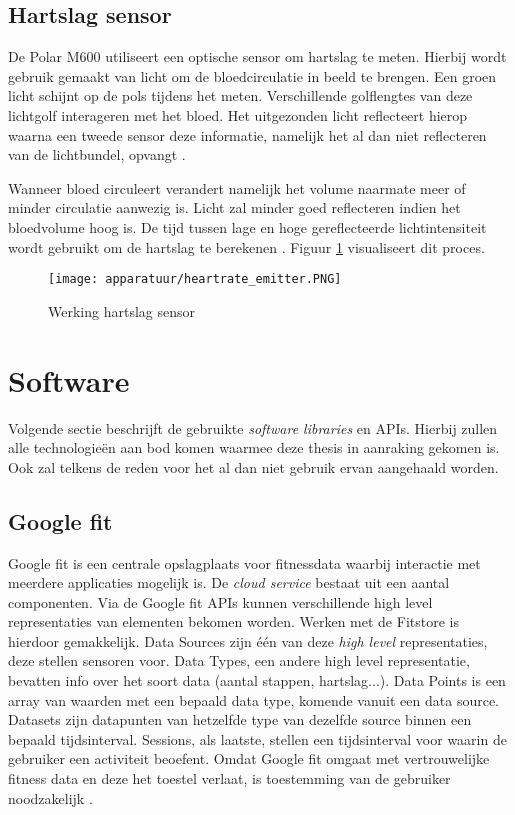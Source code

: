 \subsection{Hartslag sensor}
De Polar M600 utiliseert een optische sensor om hartslag te meten. Hierbij wordt gebruik gemaakt van licht om de bloedcirculatie in beeld te brengen. Een groen licht schijnt op de pols tijdens het meten. Verschillende golflengtes van deze lichtgolf interageren met het bloed. Het uitgezonden licht reflecteert hierop waarna een tweede sensor deze informatie, namelijk het al dan niet reflecteren van de lichtbundel, opvangt \cite{ref57}.

Wanneer bloed circuleert verandert namelijk het volume naarmate meer of minder circulatie aanwezig is. Licht zal minder goed reflecteren indien het bloedvolume hoog is. De tijd tussen lage en hoge gereflecteerde lichtintensiteit wordt gebruikt om de hartslag te berekenen \cite{ref58}. Figuur \ref{fig:hartslagsensor} visualiseert dit proces.

\begin{figure}
\centering
\caption{Werking hartslag sensor \cite{ref59}}\label{fig:hartslagsensor}
\texttt{[image: apparatuur/heartrate\_emitter.PNG]}
\end{figure} 

\section{Software}
Volgende sectie beschrijft de gebruikte \textit{software libraries} en APIs. Hierbij zullen alle technologieën aan bod komen waarmee deze thesis in aanraking gekomen is. Ook zal telkens de reden voor het al dan niet gebruik ervan aangehaald worden.

\subsection{Google fit}
Google fit is een centrale opslagplaats voor fitnessdata waarbij interactie met meerdere applicaties mogelijk is.
De \textit{cloud service} bestaat uit een aantal componenten. Via de Google fit APIs kunnen verschillende high level representaties van elementen bekomen worden. Werken met de Fitstore is hierdoor gemakkelijk. Data Sources zijn één van deze \textit{high level} representaties, deze stellen sensoren voor. Data Types, een andere high level representatie, bevatten info over het soort data (aantal stappen, hartslag...). Data Points is een array van waarden met een bepaald data type, komende vanuit een data source. Datasets zijn datapunten van hetzelfde type van dezelfde source binnen een bepaald tijdsinterval. Sessions, als laatste, stellen een tijdsinterval voor waarin de gebruiker een activiteit beoefent. 
Omdat Google fit omgaat met vertrouwelijke fitness data en deze het toestel verlaat, is toestemming van de gebruiker noodzakelijk \citep{ref10}. \\

